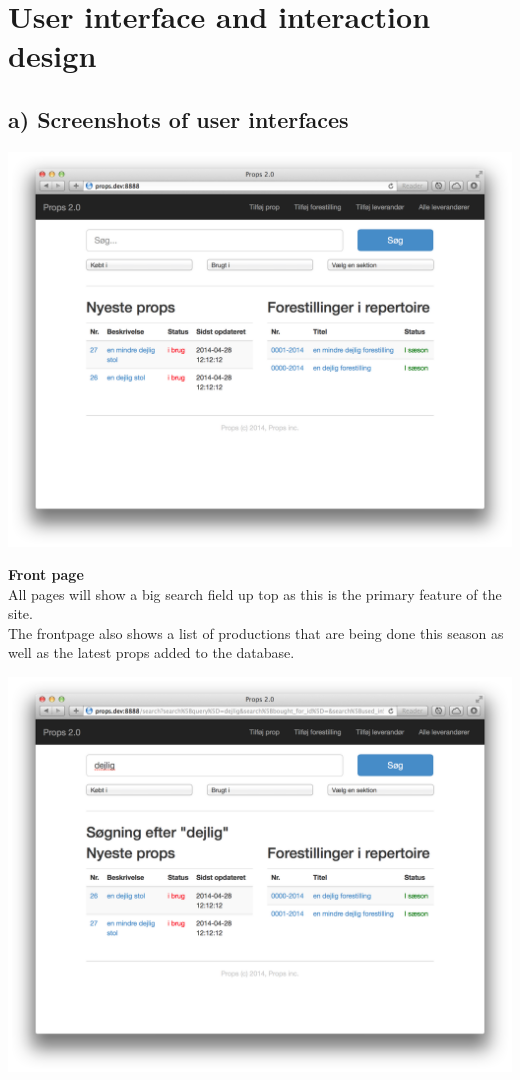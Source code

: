 \documentclass[12pt]{article}
\begin{document}
\section{User interface and interaction design}
\subsection{a) Screenshots of user interfaces}
\centerline{\includegraphics[scale=0.25]{ui-frontpage.png}}
\textbf{Front page}\\
All pages will show a big search field up top as this is the primary feature of the site.\\
The frontpage also shows a list of productions that are being done this season as well as the latest props added to the database.
\newline
\newline
\centerline{\includegraphics[scale=0.25]{ui-search-result.png}}
\end{document}
